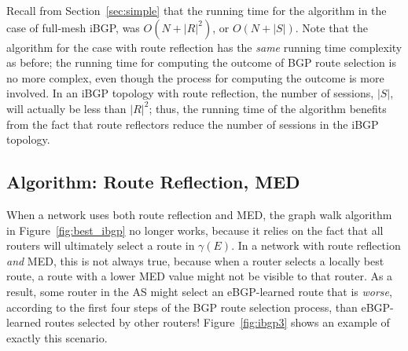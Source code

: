 Recall from Section~\ref{sec:simple} that the running time for
the algorithm in the case of full-mesh iBGP, was $O(N+|R|^2)$, or
$O(N+|S|)$.  Note that the algorithm for the case with route reflection
has the {\em same} running time complexity as before; the running time
for computing the outcome of BGP route selection is no more complex,
even though the process for computing the outcome is more involved.
In an iBGP topology with route reflection, the number of sessions,
$|S|$, will actually be less than $|R|^2$; thus, the running time of the
algorithm benefits from the fact that route reflectors
reduce the number of sessions in the iBGP topology.



\subsection{Algorithm: Route Reflection, MED}\label{sec:rr_med}

When a network uses both route reflection and MED, the graph walk
algorithm in Figure~\ref{fig:best_ibgp} no longer works, because it
relies on the fact that all routers will ultimately
select a route in $\gamma(E)$.  In a network with route reflection {\em
and} MED, this is not always true, because when a router selects a
locally best route, a route with a lower MED value might not be visible
to that router.  As a result, some router in the AS might select an
eBGP-learned route that is {\em worse}, according to the first four
steps of the BGP route selection process, than eBGP-learned routes
selected by other routers!  Figure~\ref{fig:ibgp3} shows an example of
exactly this scenario.

